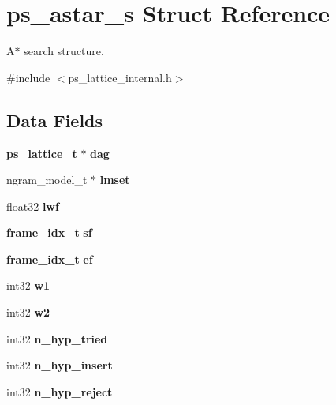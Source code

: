 \section{ps\+\_\+astar\+\_\+s Struct Reference}
\label{structps__astar__s}


A$\ast$ search structure.  




{\ttfamily \#include $<$ps\+\_\+lattice\+\_\+internal.\+h$>$}

\subsection*{Data Fields}
\begin{DoxyCompactItemize}
\item 
{\bf ps\+\_\+lattice\+\_\+t} $\ast$ {\bfseries dag}\label{structps__astar__s_a3c6c2135760c306452e7f5b995091576}

\item 
ngram\+\_\+model\+\_\+t $\ast$ {\bfseries lmset}\label{structps__astar__s_a5b7f214f56369c27753e66046fc8ef5c}

\item 
float32 {\bfseries lwf}\label{structps__astar__s_a9b1624982f8e671404581ac8b372a445}

\item 
{\bf frame\+\_\+idx\+\_\+t} {\bfseries sf}\label{structps__astar__s_a89a18074075a7793803b242bbe8a3028}

\item 
{\bf frame\+\_\+idx\+\_\+t} {\bfseries ef}\label{structps__astar__s_aa2104e1a0a3b369582b5fa920ffa51e6}

\item 
int32 {\bfseries w1}\label{structps__astar__s_ad1ada6d9fe189e9f7c028ade731967b2}

\item 
int32 {\bfseries w2}\label{structps__astar__s_aa3fcb0733516a2740086969c4b4c88e4}

\item 
int32 {\bfseries n\+\_\+hyp\+\_\+tried}\label{structps__astar__s_ad8eb709a4df4d04112578b3cb390e1c5}

\item 
int32 {\bfseries n\+\_\+hyp\+\_\+insert}\label{structps__astar__s_abd46619036fe6ff13ca9d2ca5b76512b}

\item 
int32 {\bfseries n\+\_\+hyp\+\_\+reject}\label{structps__astar__s_a3de51b20d960b50aec4d908af5e43787}


\end{DoxyCompactItemize}
